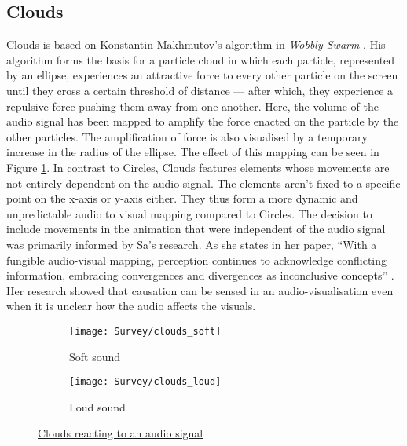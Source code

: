 \documentclass[../initial_thesis.tex]{subfiles}
\begin{document}
\subsection{Clouds}
Clouds is based on Konstantin Makhmutov's algorithm in \textit{Wobbly Swarm} \cite{Makhmutov}. His algorithm forms the basis for a particle cloud in which each particle, represented by an ellipse, experiences an attractive force to every other particle on the screen until they cross a certain threshold of distance --- after which, they experience a repulsive force pushing them away from one another. Here, the volume of the audio signal has been mapped to amplify the force enacted on the particle by the other particles. The amplification of force is also visualised by a temporary increase in the radius of the ellipse. The effect of this mapping can be seen in Figure \ref{fig:clouds1}. In contrast to Circles, Clouds features elements whose movements are not entirely dependent on the audio signal. The elements aren't fixed to a specific point on the x-axis or y-axis either. They thus form a more dynamic and unpredictable audio to visual mapping compared to Circles. The decision to include movements in the animation that were independent of the audio signal was primarily informed by Sa's research. As she states in her paper, ``With a fungible audio-visual mapping, perception continues to acknowledge conflicting information, embracing convergences and divergences as inconclusive concepts'' \cite{Sa2014}. Her research showed that causation can be sensed in an audio-visualisation even when it is unclear how the audio affects the visuals. 

\begin{figure}
  \begin{subfigure}{0.5\textwidth}
    \texttt{[image: Survey/clouds\_soft]}
    \caption{Soft sound}
  \end{subfigure} 
  \begin{subfigure}{0.5\textwidth}
    \texttt{[image: Survey/clouds\_loud]}
    \caption{Loud sound}
  \end{subfigure}
  \caption{\href{https://vimeo.com/326766069}{Clouds reacting to an audio signal}}
  \label{fig:clouds1}
\end{figure}
\end{document}
